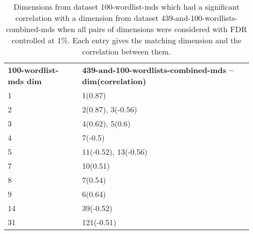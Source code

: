 \begin{table}[!tbp]
    \begin{tabular}{| ll |}
        \hline
        \textbf{100-wordlist-mds dim} & \textbf{439-and-100-wordlists-combined-mds -- dim(correlation)}\\
        1 & 1(0.87)\\
        2 & 2(0.87), 3(-0.56)\\
        3 & 4(0.62), 5(0.6)\\
        4 & 7(-0.5)\\
        5 & 11(-0.52), 13(-0.56)\\
        7 & 10(0.51)\\
        8 & 7(0.54)\\
        9 & 6(0.64)\\
        14 & 39(-0.52)\\
        31 & 121(-0.51)\\
        \hline
    \end{tabular}
    \caption{Dimensions from dataset 100-wordlist-mds which had a significant correlation with a dimension from dataset 439-and-100-wordlists-combined-mds when all pairs of dimensions were considered with FDR controlled at 1\%. Each entry gives the matching dimension and the correlation between them.}
    \label{100-vs-439and100-from-800dim-lowercase-wmt-model-significant.tex}
\end{table}
